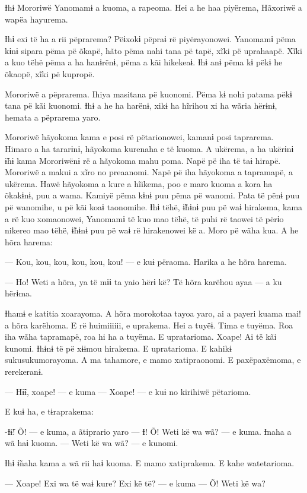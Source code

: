 
Ɨhɨ Mororiwë Yanomamɨ a kuoma, a rapeoma. Hei a he haa piyërema,
Hãxoriwë a wapëa hayurema. 

Ɨhɨ exi të ha a rii pëprarema? Pëɨxokɨ pëpraɨ rë piyërayonowei. Yanomamɨ
pëma kɨnɨ sipara pëma pë õkapë, hãto pëma nahi tana pë tapë, xĩki pë
uprahaapë. Xĩki a kuo tëhë pëma a ha hanɨrënɨ, pëma a kãi hikekeaɨ. Ɨhɨ
anɨ pëma kɨ pëkɨ he õkaopë, xĩki pë kupropë. 

Mororiwë a pëprarema. Ihiya masitana pë kuonomi. Pëma kɨ nohi patama
pëkɨ tana pë kãi kuonomi. Ɨhɨ a he ha harënɨ, xikɨ ha hĩrihou xi ha
wãria hërɨnɨ, hemata a pëprarema yaro. 

Mororiwë hãyokoma kama e posi rë pëtarionowei, kamanɨ posi taprarema.
Himaro a ha tararɨnɨ, hãyokoma kurenaha e të kuoma. A ukërema, a ha
ukërɨnɨ ɨ̃hɨ kama Mororiwënɨ rë a hãyokoma mahu poma. Napë pë iha të taɨ
hirapë. Mororiwë a makui a xĩro no preaanomi. Napë pë iha hãyokoma a
tapramapë, a ukërema. Hawë hãyokoma a kure a hĩikema, poo e maro kuoma a
kora ha õkakɨnɨ, puu a wama. Kamiyë pëma kɨnɨ puu pëma pë wanomi. Pata
të pënɨ puu pë wanomihe, u pë kãi koaɨ taonomihe. Ɨhɨ tëhë, ɨ̃hɨnɨ puu pë
waɨ hirakema, kama a rë kuo xomaonowei, Yanomamɨ të kuo mao tëhë, të
puhi rë taowei të përɨo nikereo mao tëhë, ɨ̃hɨnɨ puu pë waɨ rë
hirakenowei kë a. Moro pë wãha kua. A he hõra harema: 

— Kou, kou, kou, kou, kou, kou! --- e kuɨ përaoma. Harika a he hõra
harema. 

— Ho! Weti a hõra, ya të mɨɨ ta yaio hërɨ kë? Të hõra karëhou ayaa --- a
ku hërɨma. 

Ɨhamɨ e katitia xoarayoma. A hõra morokotaa tayoa yaro, ai a payeri
kuama mai! a hõra karëhoma. E rë huimiiiiii, e uprakema. Hei a tuyëɨ.
Tima e tuyëma. Roa iha wãha tapramapë, roa hi ha a tuyëma. E upratarioma. Xoape! Ai të kãi kunomi. Ɨhɨnɨ të pë xɨɨmou hirakema. E upratarioma. E kahikɨ sukusukumorayoma. A ma tahamore, e mamo
xatipraonomi. E paxëpaxëmoma, e rerekeranɨ. 

— Hɨ̃ɨ, xoape! --- e kuma --- Xoape! --- e kuɨ no kirihiwë pëtarioma. 

E kuɨ ha, e tɨraprakema: 

-Ɨɨ̃! Õ! --- e kuma, a ãtiprario yaro --- Ɨ! Õ! Weti kë wa wã? --- e
kuma. Ɨnaha a wã haɨ kuoma. --- Weti kë wa wã? --- e kunomi. 

Ɨhɨ ɨ̃naha kama a wã rii haɨ kuoma. E mamo xatiprakema. E kahe
watetarioma. 

— Xoape! Exi wa të waɨ kure? Exi kë të? --- e kuma --- Õ! Weti kë wa?

